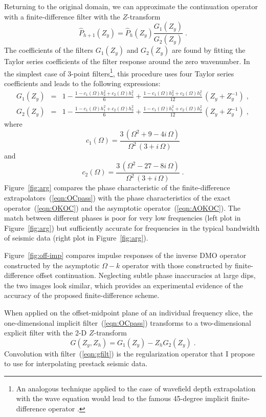 Returning to the original domain, we can approximate the continuation
operator with a finite-difference filter with the $Z$-transform
\begin{equation}
\label{eqn:OCpass}
\hat{P}_{h+1}(Z_y) = \hat{P}_{h} (Z_y) \frac{G_1(Z_y)}{G_2(Z_y)}\;.
\end{equation}
The coefficients of the filters $G_1(Z_y)$ and $G_2(Z_y)$ are found by
fitting the Taylor series coefficients of the filter response around
the zero wavenumber.  In the simplest case of 3-point
filters\footnote{An analogous technique applied to the case of
  wavefield depth extrapolation with the wave equation would lead to
  the famous 45-degree implicit finite-difference operator
  \cite{Claerbout.blackwell.85}.}, this procedure uses four Taylor
series coefficients and leads to the following expressions:
\begin{eqnarray}
  \label{eqn:OCnum}
  G_1(Z_y) & = & 1 - \frac{1 - c_1(\Omega) h_2^2 + c_2(\Omega) h_1^2}{6} +
  \frac{1 - c_1(\Omega) h_2^2 + c_2(\Omega) h_1^2}{12}\,
  \left(Z_y + Z_y^{-1}\right)\;, \\
  \label{eqn:OCden}
  G_2(Z_y) & = & 1 - \frac{1 - c_1(\Omega) h_1^2 + c_2(\Omega) h_2^2}{6} +
  \frac{1 - c_1(\Omega) h_1^2 + c_2(\Omega) h_2^2}{12}\,
  \left(Z_y + Z_y^{-1}\right)\;,
\end{eqnarray}
where 
\[
c_1(\Omega) = \frac{3\,(\Omega^2 + 9 - 4
  i\,\Omega)}{\Omega^2\,(3+i\,\Omega)}
\]
and 
\[
c_2(\Omega) =
\frac{3\,(\Omega^2 - 27 - 8 i\,\Omega)}{\Omega^2\,(3+i\,\Omega)}\;.
\]
Figure~\ref{fig:arg} compares the phase characteristic of the
finite-difference extrapolators~(\ref{eqn:OCpass}) with the phase
characteristics of the exact operator~(\ref{eqn:OKOC}) and the
asymptotic operator~(\ref{eqn:AOKOC}). The match between different
phases is poor for very low frequencies (left plot in
Figure~\ref{fig:arg}) but sufficiently accurate for frequencies in the
typical bandwidth of seismic data (right plot in
Figure~\ref{fig:arg}).

Figure~\ref{fig:off-imp} compares impulse responses of the inverse DMO
operator constructed by the asymptotic $\Omega-k$ operator with those
constructed by finite-difference offset continuation. Neglecting
subtle phase inaccuracies at large dips, the two images look similar,
which provides an experimental evidence of the accuracy of the
proposed finite-difference scheme.

When applied on the offset-midpoint plane of an individual frequency
slice, the one-dimensional implicit filter~(\ref{eqn:OCpass})
transforms to a two-dimensional explicit filter with the
2-D $Z$-transform 
\begin{equation}
\label{eqn:gfilt}
G(Z_y,Z_h) = G_1(Z_y) - Z_h G_2(Z_y)\;.
\end{equation}
Convolution with filter~(\ref{eqn:gfilt}) is the regularization
operator that I propose to use for interpolating prestack seismic data.

